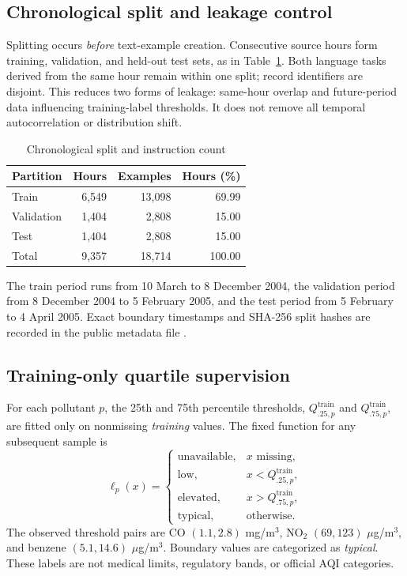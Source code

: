 \documentclass[conference,a4paper,10pt]{IEEEtran}
\begin{document}
\subsection{Chronological split and leakage control}
Splitting occurs \emph{before} text-example creation. Consecutive source hours form training, validation, and held-out test sets, as in Table~\ref{tab:splits}. Both language tasks derived from the same hour remain within one split; record identifiers are disjoint. This reduces two forms of leakage: same-hour overlap and future-period data influencing training-label thresholds. It does not remove all temporal autocorrelation or distribution shift.

\begin{table}[t]
\centering
\caption{Chronological split and instruction count}
\label{tab:splits}
\begin{tabular}{lrrr}
\toprule
Partition & Hours & Examples & Hours (\%)\\
\midrule
Train & 6,549 & 13,098 & 69.99\\
Validation & 1,404 & 2,808 & 15.00\\
Test & 1,404 & 2,808 & 15.00\\
\midrule
Total & 9,357 & 18,714 & 100.00\\
\bottomrule
\end{tabular}
\end{table}

The train period runs from 10 March to 8 December 2004, the validation period from 8 December 2004 to 5 February 2005, and the test period from 5 February to 4 April 2005. Exact boundary timestamps and SHA-256 split hashes are recorded in the public metadata file \cite{datasetrepo}.

\subsection{Training-only quartile supervision}
For each pollutant $p$, the 25th and 75th percentile thresholds, $Q_{.25,p}^{\mathrm{train}}$ and $Q_{.75,p}^{\mathrm{train}}$, are fitted only on nonmissing \emph{training} values. The fixed function for any subsequent sample is
\begin{equation}
\ell_p(x)=\begin{cases}
\mathrm{unavailable}, & x\text{ missing},\\
\mathrm{low}, & x<Q_{.25,p}^{\mathrm{train}},\\
\mathrm{elevated}, & x>Q_{.75,p}^{\mathrm{train}},\\
\mathrm{typical}, & \text{otherwise}.
\end{cases}
\end{equation}
The observed threshold pairs are CO $(1.1,2.8)$ mg/m$^3$, NO$_2$ $(69,123)$ $\mu$g/m$^3$, and benzene $(5.1,14.6)$ $\mu$g/m$^3$. Boundary values are categorized as \emph{typical}. These labels are not medical limits, regulatory bands, or official AQI categories.
\end{document}
